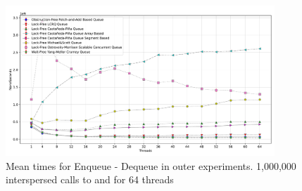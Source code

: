 \begin{figure}[ht]
  \centering
  \includegraphics[width=0.9\textwidth]{contents/figures/V_64_outer_enq_deq_all.pdf}
  \caption{\label{fig:64-outer--enq-deq} Mean times for Enqueue - Dequeue in outer experiments. 1,000,000 interspersed calls to \Enq and \Deq  for 64 threads}
\end{figure}

